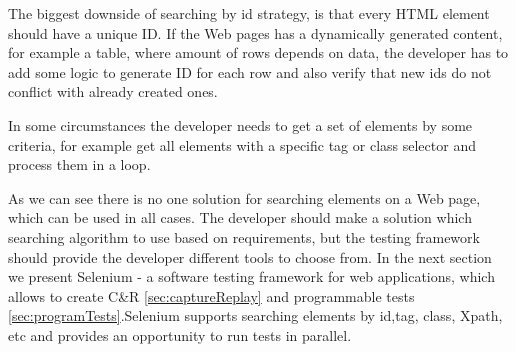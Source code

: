 		The biggest downside of searching by id strategy, is that every HTML element
		should have a unique ID. If the Web pages has a dynamically generated content,
		for example a table, where amount of rows depends on data, the
		developer has to add some logic to generate ID for each row and also verify
		that new ids do not conflict with already created ones. 
		
		In some circumstances the developer needs to get a set of elements by some
		criteria, for example get all elements with a specific tag or class selector
		and process them in a loop. 
		
		As we can see there is no one solution for searching elements on a Web page,
		which can be used in all cases. The developer should make a solution which
		searching algorithm to use based on requirements, but the testing framework
		should provide the developer different tools to choose from. In the next
		section we present Selenium - a software testing framework for web
		applications, which allows to create C\&R \ref{sec:captureReplay} and 
        programmable tests \ref{sec:programTests}.Selenium  supports searching
        elements by id,tag, class, Xpath, etc and provides an opportunity to run tests in
        parallel.
		

 